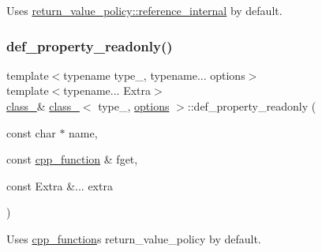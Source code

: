 Uses \mbox{\hyperlink{detail_2common_8h_adde72ab1fb0dd4b48a5232c349a53841aa39bc0596cb125c1605a78fbd287df7f}{return\+\_\+value\+\_\+policy\+::reference\+\_\+internal}} by default. 

\mbox{\label{classclass___ac7f87d627ffe20ca113b2c42eb746d45}} 
\subsubsection{\texorpdfstring{def\_property\_readonly()}{def\_property\_readonly()}\hspace{0.1cm}{\footnotesize\ttfamily [2/2]}}
{\footnotesize\ttfamily template$<$typename type\+\_\+, typename... options$>$ \\
template$<$typename... Extra$>$ \\
\mbox{\hyperlink{classclass__}{class\+\_\+}}\& \mbox{\hyperlink{classclass__}{class\+\_\+}}$<$ type\+\_\+, \mbox{\hyperlink{classoptions}{options}} $>$\+::def\+\_\+property\+\_\+readonly (\begin{DoxyParamCaption}\item[{const char $\ast$}]{name,  }\item[{const \mbox{\hyperlink{classcpp__function}{cpp\+\_\+function}} \&}]{fget,  }\item[{const Extra \&...}]{extra }\end{DoxyParamCaption})\hspace{0.3cm}{\ttfamily [inline]}}



Uses \mbox{\hyperlink{classcpp__function}{cpp\+\_\+function}}\textquotesingle{}s return\+\_\+value\+\_\+policy by default. 

\mbox{\label{classclass___afa89332683e8e7e134472d5dc83ba6b3}} 
